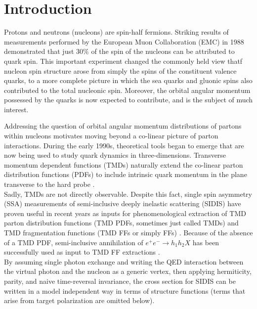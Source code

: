 \chapter{Introduction}

Protons and neutrons (nucleons) are spin-half fermions.  Striking results of measurements performed by the European Muon Collaboration (EMC) in 1988 \cite{pdfs-leader:1988} demonstrated that just $30\%$ of the spin of the nucleons can be attributed to quark spin.  This important experiment changed the commonly held view thatf nucleon spin structure arose from simply the spins of the constituent valence quarks, to a more complete picture in which the sea quarks and gluonic spins also contributed to the total nucleonic spin.  Moreover, the orbital angular momentum possessed by the quarks is now expected to contribute, and is the subject of much interest.

Addressing the question of orbital angular momentum distributions of partons within nucleons motivates moving beyond a co-linear picture of parton interactions.   During the early 1990s, theoretical tools began to emerge that are now being used to study quark dynamics in three-dimensions.  Transverse momentum dependent functions (TMDs) naturally extend the co-linear parton distribution functions (PDFs) to include intrinsic quark momentum in the plane transverse to the hard probe \cite{tmds-mulders:1995, tmds-bacchetta:2006}.  \\

Sadly, TMDs are not directly observable.  Despite this fact, single spin asymmetry (SSA) measurements of semi-inclusive deeply inelastic scattering (SIDIS) have proven useful in recent years as inputs for phenomenological extraction of TMD parton distribution functions (TMD PDFs, sometimes just called TMDs) and TMD fragmentation functions (TMD FFs or simply FFs) \cite{tmds-airapetian:2009, tmds-airapetian:2012, tmds-aghasyan:2017}.  Because of the absence of a TMD PDF, semi-inclusive annihilation of $e^+ e^- \rightarrow h_1 h_2 X$ has been successfully used as input to TMD FF extractions \cite{tmds-anselmino:2015}.  \\

By assuming single photon exchange and writing the QED interaction between the virtual photon and the nucleon as a generic vertex, then applying hermiticity, parity, and naive time-reversal invariance, the cross section for SIDIS can be written in a model independent way in terms of structure functions \cite{tmds-mulders:1995, tmds-bacchetta:2006} (terms that arise from target polarization are omitted below).  

